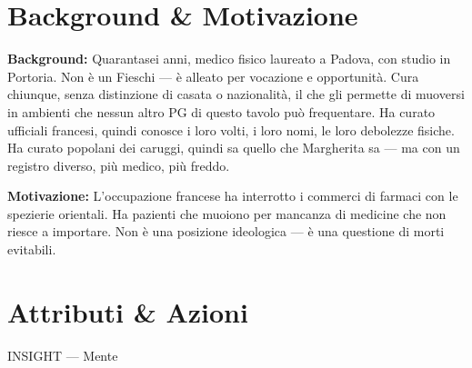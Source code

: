 \clearpage



\section*{Background \& Motivazione}

\begin{rulebox}{}
  \textbf{Background:} Quarantasei anni, medico fisico laureato a Padova, con studio
  in Portoria. Non è un Fieschi — è alleato per vocazione e opportunità. Cura chiunque,
  senza distinzione di casata o nazionalità, il che gli permette di muoversi in ambienti
  che nessun altro PG di questo tavolo può frequentare. Ha curato ufficiali francesi,
  quindi conosce i loro volti, i loro nomi, le loro debolezze fisiche. Ha curato
  popolani dei caruggi, quindi sa quello che Margherita sa — ma con un registro diverso,
  più medico, più freddo.

  \medskip\noindent\textcolor{FieschiGreen}{\textbf{Motivazione:}} L'occupazione
  francese ha interrotto i commerci di farmaci con le spezierie orientali.
  Ha pazienti che muoiono per mancanza di medicine che non riesce a importare.
  Non è una posizione ideologica — è una questione di morti evitabili.
\end{rulebox}

\section*{Attributi \& Azioni}


\begin{attributoblock}[FieschiGreen]{INSIGHT — Mente}
\end{attributoblock}


